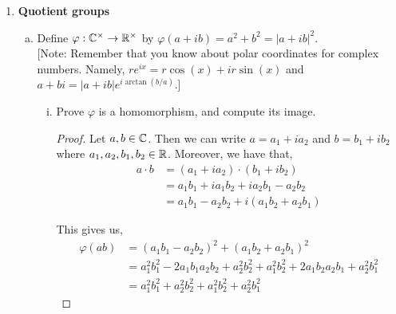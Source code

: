 \documentclass[11pt, reqno]{amsart}
\theoremstyle{plain}
\theoremstyle{definition}
\theoremstyle{example}
\def\<{\langle} \def\>{\rangle}
\begin{document}
\begin{enumerate}[1.]
\begin{enumerate}
\item A group is called \emph{finitely generated} if there is a finite set $A$ such that $H = \<A\>$. For example, every finite group and every cyclic group is finitely generated.

\smallskip

Prove that every finitely generated subgroup of $\QQ$ is cyclic. \\
{\small [Show that if $H \leq \QQ$ is  generated by the finite set $A$, then $H \leq \<1/k\>$ where $k$ is the product of all the denominators that appear in $A$. Now, what do you know about subgroups of cyclic groups?]}

\begin{proof}
Let $H$ be a finitely generated subgroup of $\QQ$. That is, there is a finite set $A \subset \QQ$ such that $H = \<A\>$.
\end{proof}

\end{enumerate}

\newpage
\item {\bf Quotient groups}
\begin{enumerate}[(a)]
\item Define $\varphi:\mathbb{C}^\times \to \mathbb{R}^\times$ by $\varphi(a + ib) = a^2 + b^2 = |a + ib|^2$.\\
{\small [Note: Remember that you know about polar coordinates for complex numbers. Namely,  $re^{ix} = r\cos(x) + i r\sin(x)$ and $a + bi = |a + ib| e^{i \arctan(b/a)}$.]}
\begin{enumerate}[(i)]
\item Prove $\varphi$ is a homomorphism, and compute its image.
\begin{proof}
Let $a, b \in \mathbb{C}$. Then we can write $a = a_1 + ia_2$ and $b = b_1 + ib_2$ where $a_1, a_2, b_1, b_2 \in \mathbb{R}$. Moreover, we have that,
\begin{align*}
a \cdot b &= (a_1 + ia_2) \cdot (b_1 + ib_2)\\
&= a_1b_1 + ia_1b_2 + ia_2b_1 - a_2b_2\\
&= a_1b_1 - a_2b_2 + i(a_1b_2 + a_2b_1)
\end{align*}

This gives us,
\begin{align*}
\varphi(ab) &= (a_1b_1 - a_2b_2)^2 + (a_1b_2 + a_2b_1)^2\\
&= a_1^2b_1^2 - 2a_1b_1a_2b_2 + a_2^2b_2^2 + a_1^2b_2^2 + 2a_1b_2a_2b_1 + a_2^2b_1^2\\
&= a_1^2b_1^2 + a_2^2b_2^2 + a_1^2b_2^2 + a_2^2b_1^2
\end{align*}


\end{proof}
\end{enumerate}
\end{enumerate}
\end{enumerate}
\end{document}
